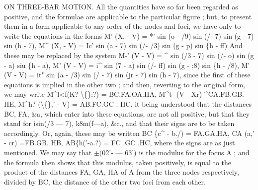 \documentclass[11pt,a4paper]{book}
\begin{document}
ON THREE-BAR MOTION.
All
the
quantities
have
so
far
been
regarded
as
positive,
and
the
formulae
are
applicable
to
the
particular
figure
;
but,
to
present
them
in
a
form
applicable
to any
order of the nodes and
foci, we have only
to
write the equations in the forms
M' (X,\guillemotright{} - V) = *' sin (o - /9) sin (/- 7) sin (g - 7) sin (h - 7),
M\textasciicircum{} (X,\guillemotright{} - V) = Ic' sin (a - 7) sin (/- /3) sin (g - p) sin \{h - ff)
And these may be replaced by the system
M-' (V - V) = \textasciicircum{} sin (/3 - 7) sin (/- o) sin (g - a) siu \{h -
a),
M' (V - V) = i\textasciicircum{} sin (7 - a) sin (/- ff) sin (g - ;8) sin \{h - /8),
M' (V - V) = it" sin (a - /3) sin (/ - 7) sin (jr - 7) sin (h - 7),
since
the
first
of
these
equations
is
implied
in
the
other
two
;
and
then,
reverting
to the original
form, we may write
M\textasciicircum{}l<f(K?-\textbackslash\{\}:?) = BC.FA.OA.HA,
M\textasciicircum{}t- (V - Xr) \textasciicircum{}CA.FB.GB. HE,
M\textasciicircum{}h? (\textbackslash\{\},' - V) = AB.FC.GC
. HC.
it
being
understood
that
the
distances BC, FA, \&a, which
enter
into
these
equations,
are
not
all
positive,
but
that
they
stand
for
isin(/3 --- 7), k8m(f---a),
\&c.,
and
that
their signs are
to be taken accordingly.
Or, again, these may be
written
BC \{c\textasciicircum{} - b./) = FA.GA.HA,
CA (a,' - cr) =FB.GB. HB,
AB\{h('-a.?) = FC .GC .HC,
where
the
signs
are
as
just
mentioned.
We may
say
that
$\pm$(02'- --- 63')
is
the modulus
for
the
focus A
;
and
the
formula
then
shows
that
this
modulus,
taken
positively,
is
equal
to
the
product
of
the
distances FA,
GA, HA
of A
from
the
three
nodes
respectively, divided by BC, the
distance of the other two
foci from each
other.
\end{document}
